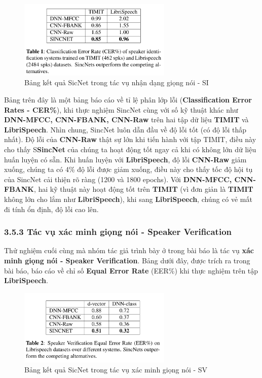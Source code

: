 \documentclass{article}
\begin{document}
	\begin{figure}[H]
		\centering
		\includegraphics[width=0.65\textwidth]{images/performance_speaker_identification.png}
		\caption{Bảng kết quả SicNet trong tác vụ nhận dạng giọng nói - SI}
		\label{fig:writing-thesis}
	\end{figure}
	Bảng trên đây là một bảng báo cáo về tỉ lệ phân lớp lỗi (\textbf{Classification Error Rates - CER\%}), khi thực nghiệm SincNet cùng với số kỹ thuật khác như \textbf{DNN-MFCC, CNN-FBANK, CNN-Raw} trên hai tập dữ liệu \textbf{TIMIT} và \textbf{LibriSpeech}. Nhìn chung, SincNet luôn dẫn đầu về độ lỗi tốt (có độ lỗi thấp nhất). Độ lỗi của \textbf{CNN-Raw} thật sự lớn khi tiến hành với tập TIMIT, điều này cho thấy S\textbf{SincNet} của chúng ta hoạt động tốt ngay cả khi có không lớn dữ liệu huấn luyện có sẵn. Khi huấn luyện với \textbf{LibriSpeech}, độ lỗi \textbf{CNN-Raw} giảm xuống, chúng ta có 4\% độ lỗi được giảm xuống, điều này cho thấy tốc độ hội tụ của SincNet cải thiện rõ ràng (1200 và 1800 epochs). Với \textbf{DNN-MFCC, CNN-FBANK}, hai kỹ thuật này hoạt động tốt trên \textbf{TIMIT} (vì đơn giản là \textbf{TIMIT} không lớn cho lắm như \textbf{LibriSpeech}), khi sang \textbf{LibriSpeech}, chúng có vẻ mất đi tính ổn định, độ lỗi cao lên.
	
	\subsubsection{3.5.3 Tác vụ xác minh giọng nói - Speaker Verification}
	Thử nghiệm cuối cùng mà nhóm tác giả trình bày ở trong bài báo là tác vụ \textbf{xác minh giọng nói - Speaker Verification}. Bảng dưới đây, được trích ra trong bài báo, báo cáo về chỉ số \textbf{Equal Error Rate} (EER\%) khi thực nghiệm trên tập \textbf{LibriSpeech}. 
	\begin{figure}[H]
		\centering
		\includegraphics[width=0.65\textwidth]{images/performance_speaker_verification.png}
		\caption{Bảng kết quả SicNet trong tác vụ xác minh giọng nói - SV}
		\label{fig:writing-thesis}
	\end{figure}
	
\end{document}
